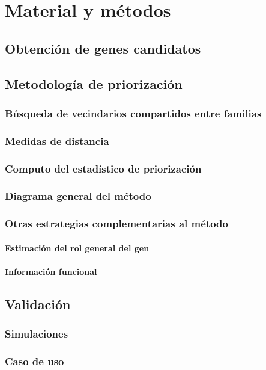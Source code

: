 \chapter{Material y métodos}


\section{Obtención de genes candidatos}



\section{Metodología de priorización}

	\subsection{Búsqueda de vecindarios compartidos entre familias}

	\subsection{Medidas de distancia}

	\subsection{Computo del estadístico de priorización}

	\subsection{Diagrama general del método}

	\subsection{Otras estrategias complementarias al método}


		\subsubsection{Estimación del rol general del gen}


		\subsubsection{Información funcional}




\section{Validación}

	\subsection{Simulaciones}

	\subsection{Caso de uso}

